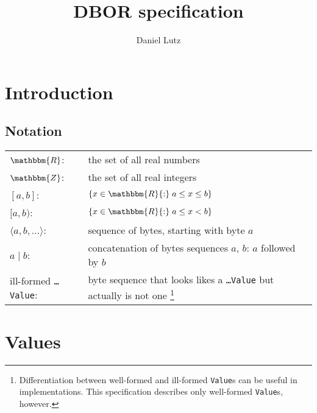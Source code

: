 \documentclass{dbor-article}
\title{DBOR specification \DborVersion}
\author{Daniel Lutz}
\newcommand{\SetOfReals}{\mathbbm{R}}
\newcommand{\SetOfIntegers}{\mathbbm{Z}}
\newcommand{\DborSyntaxIdent}[1]{\texttt{#1}}
\begin{document}
    \maketitle
    \tableofcontents

    \section{Introduction}

    \subsection{Notation}

    \noindent
    {%
        \setlength\extrarowheight{0.8ex}%
        \begin{tabular}{@{} p{} p{}}
            $\SetOfReals$: &
                the set of all real numbers \\
            $\SetOfIntegers$: &
                the set of all real integers \\
            $[a, b]$: & 
                $\{x \in \SetOfReals{:}\; a \le x \le b\}$ \\
            $[a, b)$: &
                $\{x \in \SetOfReals{:}\; a \le x < b\}$ \\
            $\langle a, b, \ldots\rangle$: & 
                sequence of bytes, starting with byte $a$ \\
            $a \mid b$: & 
                concatenation of bytes sequences $a$, $b$: $a$ followed by $b$ \\
            ill-formed \DborSyntaxIdent{\dots Value}: & 
                byte sequence that looks likes a \DborSyntaxIdent{\dots Value} but actually
                is not one%
                \footnote{
                    Differentiation between well-formed and ill-formed \DborSyntaxIdent{Value}s 
                    can be useful in implementations.
                    This specification describes only well-formed \DborSyntaxIdent{Value}s, however.
                } \\             
        \end{tabular}%
    }


    \section{Values}
    \label{sec:values}
\end{document}
